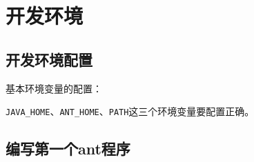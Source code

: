 
\chapter{开发环境}

\section{开发环境配置}

	基本环境变量的配置：

	\verb|JAVA_HOME|、\verb|ANT_HOME|、\verb|PATH|这三个环境变量要配置正确。

\section{编写第一个ant程序}

	

